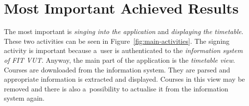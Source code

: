 \documentclass[12pt, a4paper, titlepage, final]{article}
\begin{document}
\section*{Most Important Achieved Results}

The most important is \emph{singing into the application} and \emph{displaying
the timetable}. These two activities can be seen in
Figure~\ref{fig:main-activities}. The signing activity is important because
a~user is authenticated to the \emph{information system of FIT VUT}. Anyway, the
main part of the application is the \emph{timetable view}. Courses are
downloaded from the information system. They are parsed and appropriate
information is extracted and displayed. Courses in this view may be removed and
there is also a~possibility to actualise it from the information system again.
\end{document}
